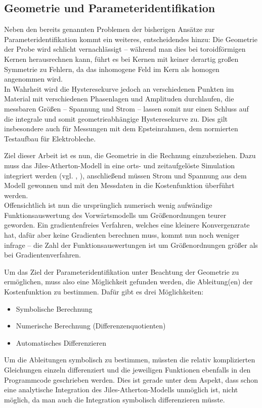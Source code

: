 \documentclass{scrartcl}
\begin{document}
\subsection{Geometrie und Parameteridentifikation}
Neben den bereits genannten Problemen der bisherigen Ansätze zur Parameteridentifikation kommt ein weiteres, entscheidendes hinzu: Die Geometrie der Probe wird schlicht vernachlässigt -- während man dies bei toroidförmigen Kernen herausrechnen kann, führt es bei Kernen mit keiner derartig großen Symmetrie zu Fehlern, da das inhomogene Feld im Kern als homogen angenommen wird.\\
In Wahrheit wird die Hysteresekurve jedoch an verschiedenen Punkten im Material mit verschiedenen Phasenlagen und Amplituden durchlaufen, die messbaren Größen -- Spannung und Strom -- lassen somit nur einen Schluss auf die integrale und somit geometrieabhängige Hysteresekurve zu. Dies gilt insbesondere auch für Messungen mit dem Epsteinrahmen, dem normierten Testaufbau für Elektrobleche.\par
Ziel dieser Arbeit ist es nun, die Geometrie in die Rechnung einzubeziehen. Dazu muss das Jiles-Atherton-Modell in eine orts- und zeitaufgelöste Simulation integriert werden (vgl. \cite{sadowski}, \cite{Bergqvist}), anschließend müssen Strom und Spannung aus dem Modell gewonnen und mit den Messdaten in die Kostenfunktion überführt werden.\\
Offensichtlich ist nun die ursprünglich numerisch wenig aufwändige Funktionsauswertung des Vorwärtsmodells um Größenordnungen teurer geworden. Ein gradientenfreies Verfahren, welches eine kleinere Konvergenzrate hat, dafür aber keine Gradienten berechnen muss, kommt nun noch weniger infrage -- die Zahl der Funktionsauswertungen ist um Größenordnungen größer als bei Gradientenverfahren.\par
Um das Ziel der Parameteridentifikation unter Beachtung der Geometrie zu ermöglichen, muss also eine Möglichkeit gefunden werden, die Ableitung(en) der Kostenfunktion zu bestimmen. Dafür gibt es drei Möglichkeiten:
\begin{itemize}
	\item Symbolische Berechnung
	\item Numerische Berechnung (Differenzenquotienten)
	\item Automatisches Differenzieren
\end{itemize}
Um die Ableitungen symbolisch zu bestimmen, müssten die relativ komplizierten Gleichungen einzeln differenziert und die jeweiligen Funktionen ebenfalls in den Programmcode geschrieben werden. Dies ist gerade unter dem Aspekt, dass schon eine analytische Integration des Jiles-Atherton-Modells unmöglich ist, nicht möglich, da man auch die Integration symbolisch differenzieren müsste.\\
\end{document}
